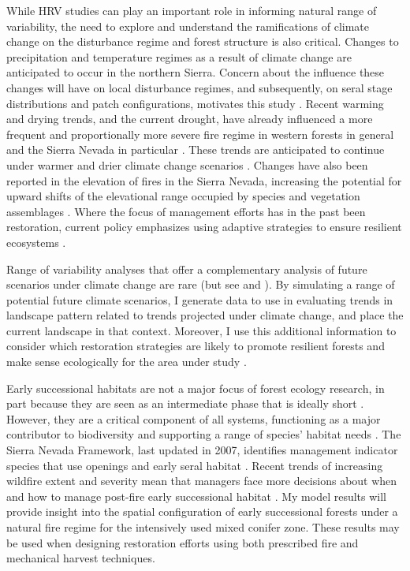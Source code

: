 While HRV studies can play an important role in informing natural range of variability, the need to explore and understand the ramifications of climate change on the disturbance regime and forest structure is also critical. Changes to precipitation and temperature regimes as a result of climate change are anticipated to occur in the northern Sierra. Concern about the influence these changes will have on local disturbance regimes, and subsequently, on seral stage distributions and patch configurations, motivates this study \citep{Fule2008,North2012}.
%
Recent warming and drying trends, and the current drought, have already influenced a more frequent and proportionally more severe fire regime in western forests in general and the Sierra Nevada in particular  \citep{McKenzie2004,Westerling2011,Miller2012}. These trends are anticipated to continue under warmer and drier climate change scenarios \citep{Dale2001,Westerling2008,Cook2004}. Changes have also been reported in the elevation of fires in the Sierra Nevada, increasing the potential for upward shifts of the elevational range occupied by species and vegetation assemblages \citep{Schwartz2015}. Where the focus of management efforts has in the past been restoration, current policy emphasizes using adaptive strategies to ensure resilient ecosystems \citep{Stephens2010}.

Range of variability analyses that offer a complementary analysis of future scenarios under climate change are rare (but see \cite{Keane2008} and \cite{Duveneck2014}). By simulating a range of potential future climate scenarios, I generate data to use in evaluating trends in landscape pattern related to trends projected under climate change, and place the current landscape in that context. Moreover, I use this additional information to consider which restoration strategies are likely to promote resilient forests and make sense ecologically for the area under study \citep{Duncan2010}.

Early successional habitats are not a major focus of forest ecology research, in part because they are seen as an intermediate phase that is ideally short \citep{Swanson2011}. However, they are a critical component of all systems, functioning as a major contributor to biodiversity and supporting a range of species' habitat needs \citep{Chang1995,Hutto2008,Swanson2011}. The Sierra Nevada Framework, last updated in 2007, identifies management indicator species that use openings and early seral habitat \citep{USDAForestService2004,USDAForestService2007}. Recent trends of increasing wildfire extent and severity mean that managers face more decisions about when and how to manage post-fire early successional habitat \citep{Stephens2013,Dellasala2014}. My model results will provide insight into the spatial configuration of early successional forests under a natural fire regime for the intensively used mixed conifer zone. These results may be used when designing restoration efforts using both prescribed fire and mechanical harvest techniques.

